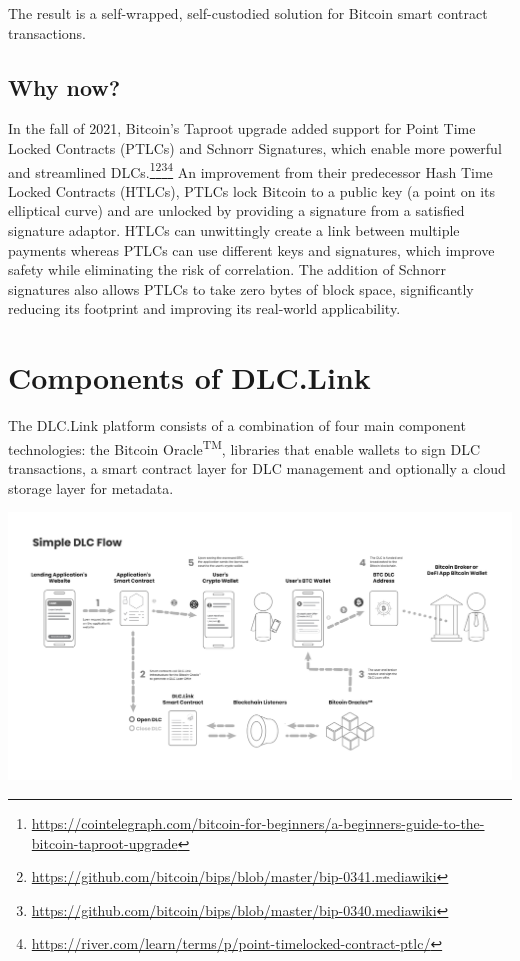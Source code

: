 \documentclass[twoside, a4paper, 11pt]{article}
\begin{document}
  The result is a self-wrapped, self-custodied solution for Bitcoin smart contract transactions.

  \subsection{Why now?}
  In the fall of 2021, Bitcoin’s Taproot upgrade added support for Point Time Locked Contracts (PTLCs) and Schnorr Signatures, which enable more powerful and streamlined DLCs.\footnote{\url{https://cointelegraph.com/bitcoin-for-beginners/a-beginners-guide-to-the-bitcoin-taproot-upgrade}}\footnote{\url{https://github.com/bitcoin/bips/blob/master/bip-0341.mediawiki}}\footnote{\url{https://github.com/bitcoin/bips/blob/master/bip-0340.mediawiki}}\footnote{\url{https://river.com/learn/terms/p/point-timelocked-contract-ptlc/}} An improvement from their predecessor Hash Time Locked Contracts (HTLCs), PTLCs lock Bitcoin to a public key (a point on its elliptical curve) and are unlocked by providing a signature from a satisfied signature adaptor. HTLCs can unwittingly create a link between multiple payments whereas PTLCs can use different keys and signatures, which improve safety while eliminating the risk of correlation. The addition of Schnorr signatures also allows PTLCs to take zero bytes of block space, significantly reducing its footprint and improving its real-world applicability.

  \section{Components of DLC.Link}

  The DLC.Link platform consists of a combination of four main component technologies: the Bitcoin Oracle\textsuperscript{TM}, libraries that enable wallets to sign DLC transactions, a smart contract layer for DLC management and optionally a cloud storage layer for metadata.
  \begin{center}
    \includegraphics[width=\textwidth]{components}
  \end{center}
\end{document}
